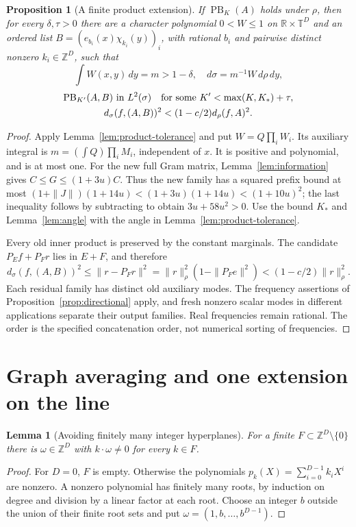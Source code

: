 \documentclass[reqno,a4paper,12pt]{amsart}
\newtheorem{proposition}[theorem]{Proposition}
\newtheorem{lemma}[theorem]{Lemma}
\theoremstyle{definition}
\newcommand{\R}{\mathbb R}
\newcommand{\Z}{\mathbb Z}
\newcommand{\T}{\mathbb T}
\newcommand{\PB}{\operatorname{PB}}
\begin{document}
\begin{proposition}[A finite product extension]\label{prop:product-extension}
If $\PB_K(A)$ holds under $\rho$, then for every $\delta,\tau>0$
there are a character polynomial $0<W\le1$ on $\R\times\T^D$
and an ordered list
$B=(e_{b_i}(x)\chi_{k_i}(y))_i$, with rational $b_i$ and pairwise
distinct nonzero $k_i\in\Z^D$, such that
\[
 \int W(x,y)\,dy=m>1-\delta,\quad
 d\sigma=m^{-1}W\,d\rho\,dy,
\]
\[
 \begin{gathered}
 \PB_{K'}(A,B)\text{ in }L^2(\sigma)
 \quad\hbox{for some }K'<\max(K,K_*)+\tau,\\
 d_\sigma(f,(A,B))^2<(1-c/2)d_\rho(f,A)^2.
 \end{gathered}
\]
\end{proposition}
\begin{proof}
Apply Lemma~\ref{lem:product-tolerance} and put $W=Q\prod_iW_i$.
Its auxiliary integral is
$m=(\int Q)\prod_iM_i$, independent of $x$.
It is positive and polynomial, and is at most one.
For the new full Gram matrix,
Lemma~\ref{lem:information} gives $C\le G\le(1+3u)C$.
Thus the new family has a squared prefix bound at most
$(1+\|J\|)(1+14u)<(1+3u)(1+14u)<(1+10u)^2$;
the last inequality follows by subtracting
to obtain $3u+58u^2>0$.
Use the bound $K_*$ and Lemma~\ref{lem:angle} with the angle in
Lemma~\ref{lem:product-tolerance}.

Every old inner product is preserved by the constant marginals.
The candidate $P_Ef+P_Fr$ lies in $E+F$, and therefore
\[
 d_\sigma(f,(A,B))^2
 \le\|r-P_Fr\|^2
 =\|r\|_\rho^2(1-\|P_Fe\|^2)
 <(1-c/2)\|r\|_\rho^2.
\]
Each residual family has distinct old auxiliary modes. The frequency
assertions of Proposition~\ref{prop:directional} apply, and fresh
nonzero scalar modes in different applications separate their output
families. Real frequencies remain rational. The order is the specified
concatenation order, not numerical sorting of frequencies.
\end{proof}

\section{Graph averaging and one extension on the line}
\begin{lemma}[Avoiding finitely many integer hyperplanes]\label{lem:integer-direction}
For a finite $F\subset\Z^D\setminus\{0\}$ there is
$\omega\in\Z^D$ with $k\cdot\omega\ne0$ for every $k\in F$.
\end{lemma}
\begin{proof}
For $D=0$, $F$ is empty. Otherwise the polynomials
$p_k(X)=\sum_{i=0}^{D-1}k_iX^i$ are nonzero. A nonzero polynomial has
finitely many roots, by induction on degree and division by a linear
factor at each root. Choose an integer $b$ outside the union of their
finite root sets and put $\omega=(1,b,\ldots,b^{D-1})$.
\end{proof}
\end{document}
